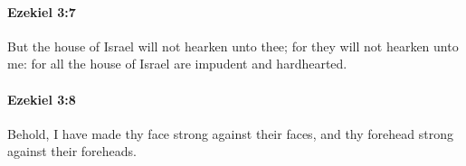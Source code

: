		\paragraph{Ezekiel 3:7} %
			\label{EZEKIEL-3-7}

			But the house of Israel will not hearken unto thee; for they will not hearken unto me: for all the house of Israel are impudent and hardhearted.


		\paragraph{Ezekiel 3:8} %
			\label{EZEKIEL-3-8}

			Behold, I have made thy face strong against their faces, and thy forehead strong against their foreheads.


